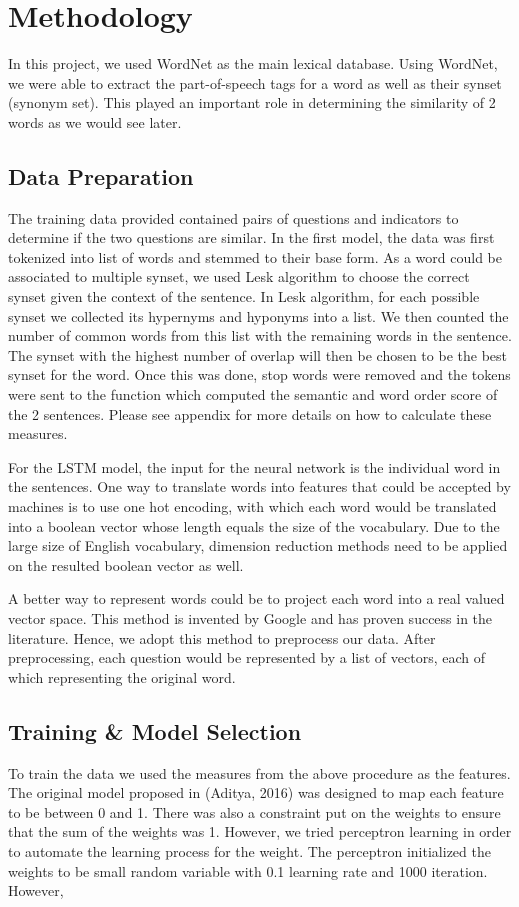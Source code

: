 \section{Methodology}
In this project, we used WordNet as the main lexical database. Using WordNet, we were able to extract the part-of-speech tags for a word as well as their synset (synonym set). This played an important role in determining the similarity of 2 words as we would see later.

\subsection{Data Preparation}
The training data provided contained pairs of questions and indicators to determine if the two questions are similar. In the first model, the data was first tokenized into list of words and stemmed to their base form. As a word could be associated to multiple synset, we used Lesk algorithm to choose the correct synset given the context of the sentence. In Lesk algorithm, for each possible synset we collected its hypernyms and hyponyms into  a list. We then counted the number of common words from this list with the remaining words in the sentence. The synset with the highest number of overlap will then be chosen to be the best synset for the word. Once this was done, stop words were removed and the tokens were sent to the function which computed the semantic and word order score of the 2 sentences. Please see appendix for more details on how to calculate these measures. 

For the LSTM model, the input for the neural network is the individual word in the sentences. One way to translate words into features that could be accepted by machines is to use one hot encoding, with which each word would be translated into a boolean vector whose length equals the size of the vocabulary. Due to the large size of English vocabulary, dimension reduction methods need to be applied on the resulted boolean vector as well. 

A better way to represent words could be to project each word into a real valued vector space. This method is invented by Google and has proven success in the literature. Hence, we adopt this method to preprocess our data. After preprocessing, each question would be represented by a list of vectors, each of which representing the original word.

\subsection{Training & Model Selection}
To train the data we used the measures from the above procedure as the features. The original model proposed in (Aditya, 2016) was designed to map each feature to be between 0 and 1. There was also a constraint put on the weights to ensure that the sum of the weights was 1. However, we tried perceptron learning in order to automate the learning process for the weight. The perceptron initialized the weights to be small random variable with 0.1 learning rate and 1000 iteration. However, 